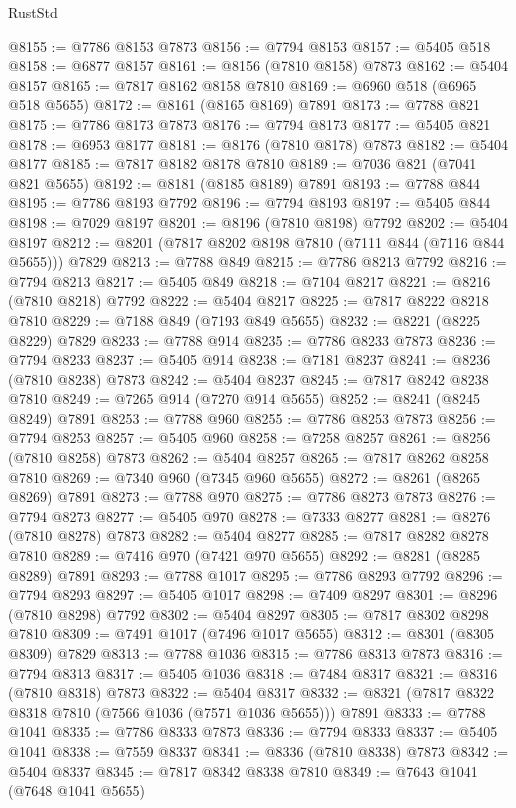 \begin{lexlean}{RustStd}
\begin{coremodule}
@8155 := @7786 @8153 @7873
@8156 := @7794 @8153
@8157 := @5405 @518
@8158 := @6877 @8157
@8161 := @8156 (@7810 @8158) @7873
@8162 := @5404 @8157
@8165 := @7817 @8162 @8158 @7810
@8169 := @6960 @518 (@6965 @518 @5655)
@8172 := @8161 (@8165 @8169) @7891
@8173 := @7788 @821
@8175 := @7786 @8173 @7873
@8176 := @7794 @8173
@8177 := @5405 @821
@8178 := @6953 @8177
@8181 := @8176 (@7810 @8178) @7873
@8182 := @5404 @8177
@8185 := @7817 @8182 @8178 @7810
@8189 := @7036 @821 (@7041 @821 @5655)
@8192 := @8181 (@8185 @8189) @7891
@8193 := @7788 @844
@8195 := @7786 @8193 @7792
@8196 := @7794 @8193
@8197 := @5405 @844
@8198 := @7029 @8197
@8201 := @8196 (@7810 @8198) @7792
@8202 := @5404 @8197
@8212 := @8201 (@7817 @8202 @8198 @7810 (@7111 @844 (@7116 @844 @5655))) @7829
@8213 := @7788 @849
@8215 := @7786 @8213 @7792
@8216 := @7794 @8213
@8217 := @5405 @849
@8218 := @7104 @8217
@8221 := @8216 (@7810 @8218) @7792
@8222 := @5404 @8217
@8225 := @7817 @8222 @8218 @7810
@8229 := @7188 @849 (@7193 @849 @5655)
@8232 := @8221 (@8225 @8229) @7829
@8233 := @7788 @914
@8235 := @7786 @8233 @7873
@8236 := @7794 @8233
@8237 := @5405 @914
@8238 := @7181 @8237
@8241 := @8236 (@7810 @8238) @7873
@8242 := @5404 @8237
@8245 := @7817 @8242 @8238 @7810
@8249 := @7265 @914 (@7270 @914 @5655)
@8252 := @8241 (@8245 @8249) @7891
@8253 := @7788 @960
@8255 := @7786 @8253 @7873
@8256 := @7794 @8253
@8257 := @5405 @960
@8258 := @7258 @8257
@8261 := @8256 (@7810 @8258) @7873
@8262 := @5404 @8257
@8265 := @7817 @8262 @8258 @7810
@8269 := @7340 @960 (@7345 @960 @5655)
@8272 := @8261 (@8265 @8269) @7891
@8273 := @7788 @970
@8275 := @7786 @8273 @7873
@8276 := @7794 @8273
@8277 := @5405 @970
@8278 := @7333 @8277
@8281 := @8276 (@7810 @8278) @7873
@8282 := @5404 @8277
@8285 := @7817 @8282 @8278 @7810
@8289 := @7416 @970 (@7421 @970 @5655)
@8292 := @8281 (@8285 @8289) @7891
@8293 := @7788 @1017
@8295 := @7786 @8293 @7792
@8296 := @7794 @8293
@8297 := @5405 @1017
@8298 := @7409 @8297
@8301 := @8296 (@7810 @8298) @7792
@8302 := @5404 @8297
@8305 := @7817 @8302 @8298 @7810
@8309 := @7491 @1017 (@7496 @1017 @5655)
@8312 := @8301 (@8305 @8309) @7829
@8313 := @7788 @1036
@8315 := @7786 @8313 @7873
@8316 := @7794 @8313
@8317 := @5405 @1036
@8318 := @7484 @8317
@8321 := @8316 (@7810 @8318) @7873
@8322 := @5404 @8317
@8332 := @8321 (@7817 @8322 @8318 @7810 (@7566 @1036 (@7571 @1036 @5655))) @7891
@8333 := @7788 @1041
@8335 := @7786 @8333 @7873
@8336 := @7794 @8333
@8337 := @5405 @1041
@8338 := @7559 @8337
@8341 := @8336 (@7810 @8338) @7873
@8342 := @5404 @8337
@8345 := @7817 @8342 @8338 @7810
@8349 := @7643 @1041 (@7648 @1041 @5655)

\end{coremodule}
\end{lexlean}
